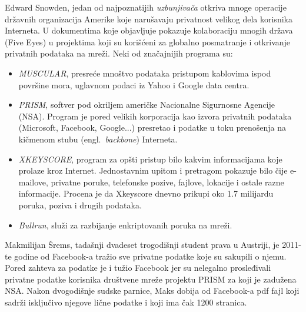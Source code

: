 \documentclass[a4paper]{article}
\begin{document}
Edward Snowden, jedan od najpoznatijih \textit{uzbunjivača} otkriva mnoge operacije državnih organizacija Amerike koje narušavaju privatnost velikog dela korisnika Interneta. U dokumentima koje objavljuje pokazuje kolaboraciju mnogih država (Five Eyes\cite{?}) u projektima koji su korišćeni za globalno posmatranje i otkrivanje privatnih podataka na mreži. Neki od značajnijih programa su: \cite{?}
\begin{itemize}
	\item \textit{MUSCULAR}, presreće mnoštvo podataka pristupom kablovima ispod površine mora, uglavnom podaci iz Yahoo i Google data centra. \cite{?}
	\item \textit{PRISM}, softver pod okriljem američke Nacionalne Sigurnosne Agencije (NSA). Program je pored velikih korporacija kao izvora privatnih podataka (Microsoft, Facebook, Google...) presretao i podatke u toku prenošenja na kičmenom stubu (engl.~{\em backbone}) Interneta. \cite{?}
	\item \textit{XKEYSCORE}, program za opšti pristup bilo kakvim informacijama koje prolaze kroz Internet. Jednostavnim upitom i pretragom pokazuje bilo čije e-mailove, privatne poruke, telefonske pozive, fajlove, lokacije i ostale razne informacije. Procena je da Xkeyscore dnevno prikupi oko 1.7 milijardu poruka, poziva i drugih podataka. \cite{?}
	\item \textit{Bullrun}, služi za razbijanje enkriptovanih poruka na mreži.
\end{itemize}


	Makmilijan Šrems, tadašnji dvadeset trogodišnji student prava u
Austriji, je 2011-te godine od Facebook-a tražio sve privatne podatke koje su sakupili o njemu. Pored zahteva za podatke je i tužio Facebook jer su nelegalno prosleđivali privatne podatke korisnika društvene mreže projektu PRISM\cite{?} za koji je zadužena NSA. Nakon dvogodišnje sudske parnice, Maks dobija od Facebook-a pdf fajl koji sadrži isključivo njegove lične podatke i koji ima čak 1200 stranica. \cite{?}
\\
\end{document}
